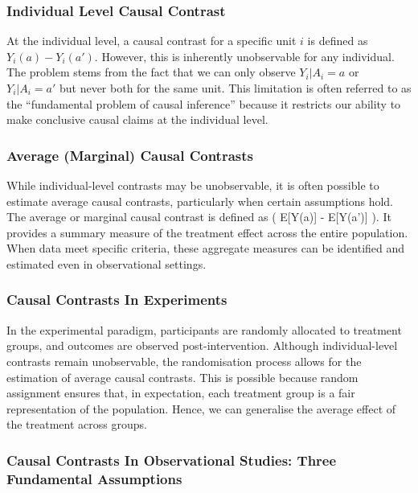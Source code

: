 \documentclass[
  singlecolumn]{article}
\begin{document}
\subsubsection{Individual Level Causal
Contrast}\label{individual-level-causal-contrast}

At the individual level, a causal contrast for a specific unit \(i\) is
defined as \(Y_i(a) - Y_i(a')\). However, this is inherently
unobservable for any individual. The problem stems from the fact that we
can only observe \(Y_i | A_i = a\) or \(Y_i | A_i = a'\) but never both
for the same unit. This limitation is often referred to as the
``fundamental problem of causal inference'' because it restricts our
ability to make conclusive causal claims at the individual level.

\subsubsection{Average (Marginal) Causal
Contrasts}\label{average-marginal-causal-contrasts}

While individual-level contrasts may be unobservable, it is often
possible to estimate average causal contrasts, particularly when certain
assumptions hold. The average or marginal causal contrast is defined as
( E{[}Y(a){]} - E{[}Y(a'){]} ). It provides a summary measure of the
treatment effect across the entire population. When data meet specific
criteria, these aggregate measures can be identified and estimated even
in observational settings.

\subsubsection{Causal Contrasts In
Experiments}\label{causal-contrasts-in-experiments}

In the experimental paradigm, participants are randomly allocated to
treatment groups, and outcomes are observed post-intervention. Although
individual-level contrasts remain unobservable, the randomisation
process allows for the estimation of average causal contrasts. This is
possible because random assignment ensures that, in expectation, each
treatment group is a fair representation of the population. Hence, we
can generalise the average effect of the treatment across groups.

\subsubsection{Causal Contrasts In Observational Studies: Three
Fundamental
Assumptions}\label{causal-contrasts-in-observational-studies-three-fundamental-assumptions}
\end{document}
